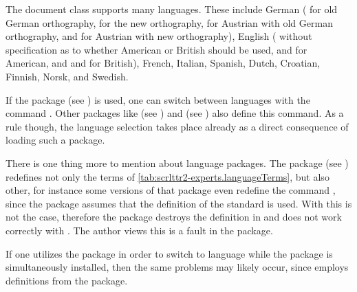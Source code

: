 The document class  supports many languages.  These include
German ( for old German orthography,
 for the new orthography,  for Austrian with
old German orthography, and
 for Austrian with new
orthography), English ( without
specification as to whether American or British should be used,
 and  for American, and 
and  for British), French,
Italian, Spanish,
Dutch, Croatian,
Finnish,
Norsk, and
Swedish.

If the package  (see
\cite{package:babel}) is used, one can switch between languages with
the command .  Other
packages like  (see
\cite{package:german}) and 
(see \cite{package:ngerman}) also define this command.  As a rule
though, the language selection takes place already as a direct
consequence of loading such a package. 
\iffalse%
Further information can be obtained in the documentation of the relevant
packages.
\fi

There is one thing more to mention about language
packages.  The package
 (see
\cite{package:french}) redefines not only the terms of
\autoref{tab:scrlttr2-experts.languageTerms}, but also other, for instance
some versions of that package even redefine the command , since
the package assumes that the definition of the standard  is
used.  With  this is not the case, therefore the package
 destroys the definition in  and does not work
correctly with \KOMAScript. The author views this is a fault in the
 package.

If one utilizes the  package in order to
switch to language  while the package
 is simultaneously installed, then the
same problems may likely occur, since  employs definitions
from the  package. 
%
\iffalse%
If the package \Package{french} is not
installed then there are no problems. Aimilarly, there is no problem if for
\Package{babel} instead of \PValue{french} other languages like
\PValue{acadian}, \PValue{canadien}, \PValue{francais} or \PValue{frenchb} are
chosen.
\fi

